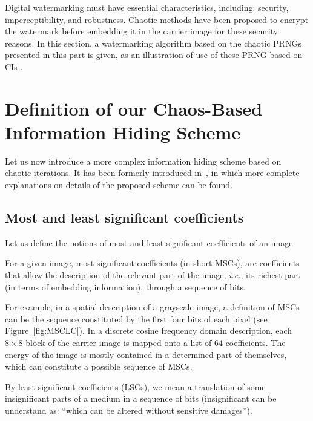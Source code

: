 Digital watermarking must have essential characteristics, including: security, imperceptibility, and robustness.
Chaotic methods have been proposed to encrypt the watermark before embedding it in the carrier image for these security reasons. %
In this section, a watermarking algorithm based on the chaotic PRNGs presented in this part is given, as an 
illustration of use of these PRNG based on CIs \cite{submit2, bibtexwangqianxue}.

\section{Definition of our Chaos-Based Information Hiding Scheme}
\label{sec:Algo}

Let us now introduce a more complex information hiding scheme based on chaotic iterations.
It has been formerly introduced in~\cite{gfb10:ip,bg10:ip}, in which more complete 
explanations on details of the
proposed scheme can be found.


\subsection{Most and least significant coefficients}

Let us define the notions of most and least significant coefficients of an image.

\begin{Definition}
\label{definitionMSC}
For a given image, most significant coefficients (in short MSCs), are coefficients that allow the description of the relevant part of the image, \emph{i.e.}, its richest part (in terms of embedding information), through a sequence of bits.
\end{Definition}

For example, in a spatial description of a grayscale image, a definition of MSCs can be the sequence constituted by the first four bits of each pixel (see Figure~\ref{fig:MSCLC}). In a discrete cosine frequency domain description, each $8\times 8$ block of the carrier image is mapped onto a list of 64 coefficients. The energy of the image is mostly contained in a determined part of themselves, which can constitute a possible sequence of MSCs.

\begin{Definition}
\label{definitionLSC}
By least significant coefficients (LSCs), we mean a translation of some insignificant parts of a medium in a sequence of bits (insignificant can be understand as: ``which can be altered without sensitive damages'').
\end{Definition}

